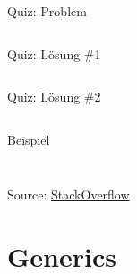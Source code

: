 \documentclass[usepdftitle=false,hyperref={pdfpagelabels=false}]{beamer}
\begin{document}
\begin{frame}{Quiz: Problem}
    \inputminted[linenos=false, numbersep=5pt, tabsize=4, fontsize=\small]{java}{Fruit-Example-Problem.java}
\end{frame}

\begin{frame}{Quiz: Lösung \#1}
    \inputminted[linenos=true, numbersep=5pt, tabsize=4, fontsize=\small]{java}{Main-Quiz-solution.java}
\end{frame}

\begin{frame}{Quiz: Lösung \#2}
    \inputminted[linenos=true, numbersep=5pt, tabsize=4, fontsize=\small]{java}{Main-Quiz-solution2.java}
\end{frame}

\begin{frame}{Beispiel}
    \begin{minipage}[b]{0.45\linewidth}
        \inputminted[linenos=true, numbersep=5pt, tabsize=4, fontsize=\tiny, label=Cage.java, frame=lines]{java}{Cage.java}
    \end{minipage}
    \hspace{0.5cm}
    \begin{minipage}[b]{0.45\linewidth}
       \inputminted[linenos=true, numbersep=5pt, tabsize=4, fontsize=\tiny]{java}{Animal.java}
    \end{minipage}

    {\tiny Source: \href{http://stackoverflow.com/a/6828257/562769}{StackOverflow}}
\end{frame}

\section{Generics}
\end{document}
